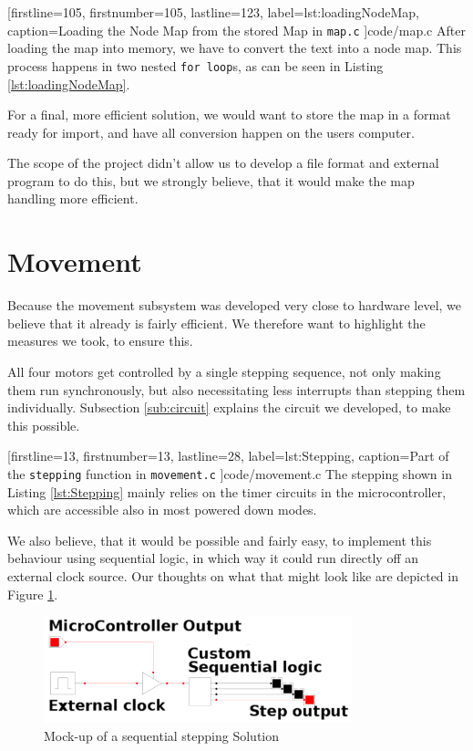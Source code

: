 
[firstline=105,				%
firstnumber=105,
lastline=123,
label=lst:loadingNodeMap,	%
caption={Loading the Node Map from the stored Map in {\tt map.c}}
]{code/map.c}
%
After loading the map into memory,
we have to convert the text into a node map.
This process happens in two nested {\tt for loop}s, as can be seen in Listing \ref{lst:loadingNodeMap}.

For a final, more efficient solution,
we would want to store the map in a format ready for import,
and have all conversion happen on the users computer.

The scope of the project didn't allow us to develop a file format and external program to do this,
but we strongly believe,
that it would make the map handling more efficient.

\section{Movement}
Because the movement subsystem was developed very close to hardware level,
we believe that it already is fairly efficient.
We therefore want to highlight the measures we took,
to ensure this.

All four motors get controlled by a single stepping sequence,
not only making them run synchronously,
but also necessitating less interrupts than stepping them individually.
Subsection \ref{sub:circuit} explains the circuit we developed,
to make this possible.


[firstline=13,				%
firstnumber=13,
lastline=28,
label=lst:Stepping,	%
caption={Part of the {\tt stepping} function in {\tt movement.c}}
]{code/movement.c}
%
The stepping shown in Listing \ref{lst:Stepping} mainly relies on the timer circuits in the microcontroller,
which are accessible also in most powered down modes.

We also believe, that it would be possible and fairly easy,
to implement this behaviour using sequential logic,
in which way it could run directly off an external clock source.
Our thoughts on what that might look like are depicted in Figure \ref{fig:sequential}.

\begin{figure}[hp]
	\centering
	\includegraphics[width=0.8\textwidth]{figures/move/sequential_logic}
	\caption{Mock-up of a sequential stepping Solution}
	\label{fig:sequential}
\end{figure}
%